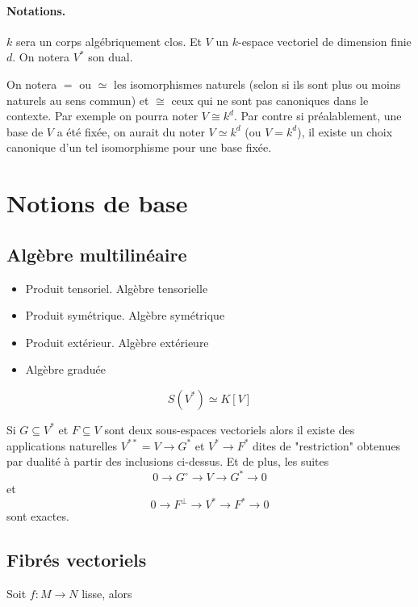 \documentclass[a4paper,10pt,draft]{article}
\begin{document}
\paragraph*{Notations.} $k$ sera un corps algébriquement clos. Et $V$ un $k$-espace vectoriel de dimension finie $d$. On notera $V^*$ son dual.

On notera $=$ ou $\simeq$ les isomorphismes naturels (selon si ils sont plus ou moins naturels au sens commun) et $\cong$ ceux qui ne sont pas canoniques dans le contexte. Par exemple on pourra noter $V \cong k^d$. Par contre si préalablement, une base de $V$ a été fixée, on aurait du noter $V \simeq k^d$ (ou $V=k^d$), il existe un choix canonique d'un tel isomorphisme pour une base fixée.
\section{Notions de base}
\subsection{Algèbre multilinéaire}
\begin{itemize}
\item Produit tensoriel. Algèbre tensorielle
\item Produit symétrique. Algèbre symétrique
\item Produit extérieur. Algèbre extérieure
\item Algèbre graduée
\end{itemize}

\begin{prop}
\[
S(V^*) \simeq K[V]
\]
\end{prop}

\begin{prop}
Si $G \subseteq V^*$ et $F \subseteq V$ sont deux sous-espaces vectoriels alors
il existe des applications naturelles $V^{**} = V \rightarrow G^*$ et $V^* \rightarrow F^*$ dites de "restriction" obtenues par dualité à partir des inclusions ci-dessus. Et de plus, les suites 
\[
0 \rightarrow G^\circ \rightarrow V \rightarrow G^* \rightarrow 0
\]
et
\[
0 \rightarrow  F^\bot \rightarrow V^* \rightarrow F^* \rightarrow 0
\]
sont exactes.
\end{prop}
\subsection{Fibrés vectoriels}
Soit $f : M \rightarrow N$ lisse, alors
\begin{center}\end{center}
\end{document}
